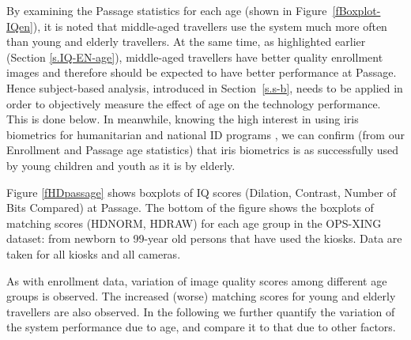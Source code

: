 \documentclass{cta-author}%
\begin{document}
By examining the Passage statistics for each age (shown in Figure~\ref{fBoxplot-IQen}), 
it is noted that  middle-aged travellers  use the system much more often than young and elderly travellers. 
At the same time, as highlighted earlier (Section \ref{s.IQ-EN-age}),  middle-aged travellers  have  better quality enrollment images and therefore should be expected to  have better performance at Passage. 
Hence 
subject-based analysis, introduced in Section~\ref{s.s-b}, needs to be applied in order to  objectively measure the effect of age on the technology performance.  This is done below.
In meanwhile, knowing the high interest in using iris
biometrics for humanitarian and national ID programs \cite{FBI-IJCB2014}, we can
confirm (from our Enrollment and Passage age statistics) that iris
biometrics is as successfully used by young children and youth as it is
by elderly.










Figure \ref{fHDpassage} shows boxplots of IQ scores  (Dilation, Contrast, Number of Bits Compared) at Passage. The bottom of the  figure shows the boxplots of matching scores (HDNORM, HDRAW) for each age group in the OPS-XING dataset: from newborn to 99-year old persons that have used the kiosks. Data are taken for all kiosks and all cameras.

As with enrollment data, variation of image quality scores among different age groups is observed. The increased (worse) matching scores for young and elderly travellers are also observed.
In the following we further  quantify the variation of the system performance due to age, and compare it to that due to other factors. 
\end{document}
